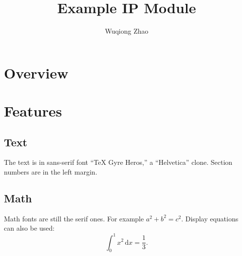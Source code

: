 \documentclass{ip-doc}
\title{Example IP Module}
\author{Wuqiong Zhao}
\begin{document}
\maketitle

\section{Overview}

\section{Features}

\subsection{Text}
The text is in sans-serif font ``TeX Gyre Heros,'' a ``Helvetica'' clone.
Section numbers are in the left margin.

\subsection{Math}
Math fonts are still the serif ones.
For example $a^2 + b^2 = c^2$.
Display equations can also be used:
\begin{equation}
  \int_0^1 x^2 \, \mathrm{d}x = \frac13.
\end{equation}
\end{document}
